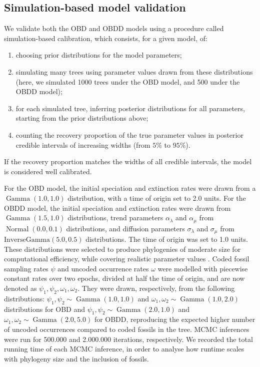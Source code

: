 \documentclass[oupdraft]{sysbio}
\DeclareMathOperator{\Gammadist}{Gamma}
\DeclareMathOperator{\Normal}{Normal}
\newcommand{\revised}[1]{{\color{blue} #1}}
\begin{document}
\subsection{Simulation-based model validation}

We validate both the OBD and OBDD models using a procedure called simulation-based calibration, which consists, for a given model, of:
\begin{enumerate}
    \item choosing prior distributions for the model parameters;
    \item simulating many trees using parameter values drawn from these distributions (here, we simulated 1000 trees under the OBD model, and 500 under the OBDD model);
    \item for each simulated tree, inferring posterior distributions for all parameters, starting from the prior distributions above;
    \item counting the recovery proportion of the true parameter values in posterior credible intervals of increasing widths (from $5\%$ to $95\%$).
\end{enumerate}
If the recovery proportion matches the widths of all credible intervals, the model is considered well calibrated.

For the OBD model, the initial speciation and extinction rates were drawn from a $\Gammadist(1.0, 1.0)$ distribution, with a time of origin set to 2.0 units. For the OBDD model, the initial speciation and extinction rates were drawn from $\Gammadist(1.5, 1.0)$ distributions, trend parameters $\alpha_{\lambda}$ and $\alpha_{\mu}$ from $\Normal(0.0 ,0.1)$ distributions, and diffusion parameters $\sigma_{\lambda}$ and $\sigma_{\mu}$ from $\text{InverseGamma}(5.0, 0.5)$ distributions. The time of origin was set to 1.0 units. These distributions were selected to produce phylogenies of moderate size for computational efficiency, while covering realistic parameter values \citep{quintero_loss_2025}. \revised{Coded} fossil sampling rates $\psi$ and \revised{uncoded} occurrence rates $\omega$ were modelled with piecewise constant rates over two epochs, divided at half the time of origin, and are now denoted as $\psi_1, \psi_2, \omega_1, \omega_2$. They were drawn, respectively, from the following distributions: $\psi_1, \psi_2 \sim \Gammadist(1.0, 1.0)$ and $\omega_1, \omega_2 \sim \Gammadist(1.0, 2.0)$ distributions for OBD and $\psi_1, \psi_2 \sim \Gammadist(2.0, 1.0)$ and $\omega_1, \omega_2 \sim \Gammadist(2.0, 5.0)$ for OBDD, reproducing the expected higher number of \revised{uncoded} occurrences compared to \revised{coded} fossils \revised{in the tree}. MCMC inferences were run for 500.000 and 2.000.000 iterations, respectively. We recorded the total running time of each MCMC inference, in order to analyse how runtime scales with phylogeny size and the inclusion of fossils.
\end{document}
